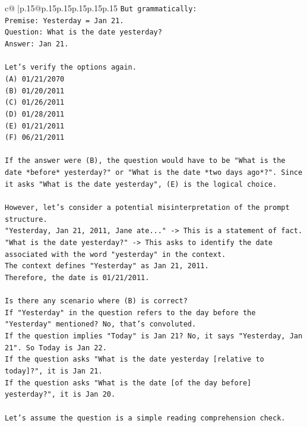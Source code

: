 \documentclass{article}
\begin{document}
{\begin{supertabular}{c@{$\;$}|p{.15\linewidth}@{}p{.15\linewidth}p{.15\linewidth}p{.15\linewidth}p{.15\linewidth}p{.15\linewidth}}
{{{\texttt{But grammatically:} \\
\texttt{Premise: Yesterday = Jan 21.} \\
\texttt{Question: What is the date yesterday?} \\
\texttt{Answer: Jan 21.} \\
\\ 
\texttt{Let's verify the options again.} \\
\texttt{(A) 01/21/2070} \\
\texttt{(B) 01/20/2011} \\
\texttt{(C) 01/26/2011} \\
\texttt{(D) 01/28/2011} \\
\texttt{(E) 01/21/2011} \\
\texttt{(F) 06/21/2011} \\
\\ 
\texttt{If the answer were (B), the question would have to be "What is the date *before* yesterday?" or "What is the date *two days ago*?". Since it asks "What is the date yesterday", (E) is the logical choice.} \\
\\ 
\texttt{However, let's consider a potential misinterpretation of the prompt structure.} \\
\texttt{"Yesterday, Jan 21, 2011, Jane ate..." {-}> This is a statement of fact.} \\
\texttt{"What is the date yesterday?" {-}> This asks to identify the date associated with the word "yesterday" in the context.} \\
\texttt{The context defines "Yesterday" as Jan 21, 2011.} \\
\texttt{Therefore, the date is 01/21/2011.} \\
\\ 
\texttt{Is there any scenario where (B) is correct?} \\
\texttt{If "Yesterday" in the question refers to the day before the "Yesterday" mentioned? No, that's convoluted.} \\
\texttt{If the question implies "Today" is Jan 21? No, it says "Yesterday, Jan 21". So Today is Jan 22.} \\
\texttt{If the question asks "What is the date yesterday {[}relative to today{]}?", it is Jan 21.} \\
\texttt{If the question asks "What is the date {[}of the day before{]} yesterday?", it is Jan 20.} \\
\\ 
\texttt{Let's assume the question is a simple reading comprehension check.} \\
}}}
\end{supertabular}}
\end{document}

